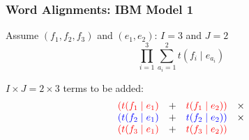 \begin{frame}
\frametitle{Word Alignments: IBM Model 1}
\begin{block}{Assume $(f_1, f_2, f_3)$ and $(e_1, e_2)$: $I=3$ and $J=2$}
\[ \prod_{i=1}^3 \sum_{a_i=1}^2 t(f_i \mid e_{a_i}) \]
\end{block}
\begin{block}{$I \times J = 2 \times 3$ terms to be added:}
\[ 
\begin{array}{cccc}
\color{red} ( t(f_1 \mid e_1) & + & \color{red} t(f_1 \mid e_2) ) & \times \\
\color{blue} ( t(f_2 \mid e_1) & + & \color{blue} t(f_2 \mid e_2) ) & \times \\
\color{red} ( t(f_3 \mid e_1) & + & \color{red} t(f_3 \mid e_2) ) & 
\end{array}
\]
\end{block}

\end{frame}




